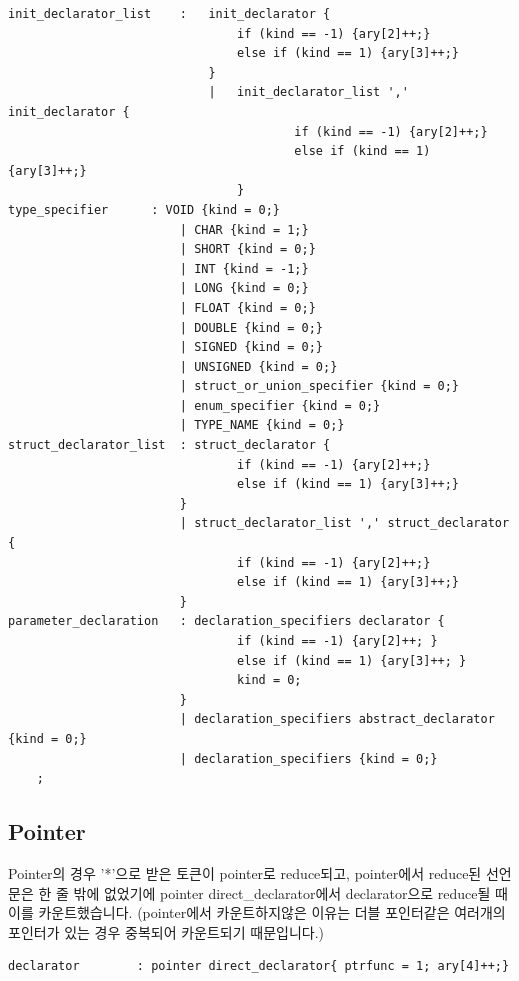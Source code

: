 \documentclass{article}
\begin{document}
\begin{verbatim}
init_declarator_list    :   init_declarator {
                                if (kind == -1) {ary[2]++;} 
                                else if (kind == 1) {ary[3]++;}
                            }
	                        |   init_declarator_list ',' init_declarator {
		                                if (kind == -1) {ary[2]++;} 
		                                else if (kind == 1) {ary[3]++;}
	                            }
type_specifier      : VOID {kind = 0;}
	                    | CHAR {kind = 1;}
	                    | SHORT {kind = 0;}
	                    | INT {kind = -1;}
	                    | LONG {kind = 0;}
	                    | FLOAT {kind = 0;}
	                    | DOUBLE {kind = 0;}
	                    | SIGNED {kind = 0;}
	                    | UNSIGNED {kind = 0;}
	                    | struct_or_union_specifier {kind = 0;}
	                    | enum_specifier {kind = 0;}
	                    | TYPE_NAME {kind = 0;}
struct_declarator_list  : struct_declarator {
		                        if (kind == -1) {ary[2]++;} 
		                        else if (kind == 1) {ary[3]++;}
	                    }
	                    | struct_declarator_list ',' struct_declarator {
		                        if (kind == -1) {ary[2]++;} 
		                        else if (kind == 1) {ary[3]++;}
	                    }
parameter_declaration   : declaration_specifiers declarator {
		                        if (kind == -1) {ary[2]++; } 
		                        else if (kind == 1) {ary[3]++; }
		                        kind = 0; 
	                    }
	                    | declaration_specifiers abstract_declarator {kind = 0;}
	                    | declaration_specifiers {kind = 0;}
	;
\end{verbatim}
\newpage
    \subsection{Pointer}
        Pointer의 경우 '*'으로 받은 토큰이 pointer로 reduce되고, pointer에서 reduce된 선언 문은 한 줄 밖에 없었기에 pointer direct\_declarator에서 declarator으로 
        reduce될 때 이를 카운트했습니다. (pointer에서 카운트하지않은 이유는 더블 포인터같은 여러개의 포인터가 있는 경우 중복되어 카운트되기 때문입니다.)
\begin{verbatim}
declarator        : pointer direct_declarator{ ptrfunc = 1; ary[4]++;} 
\end{verbatim}
\end{document}
